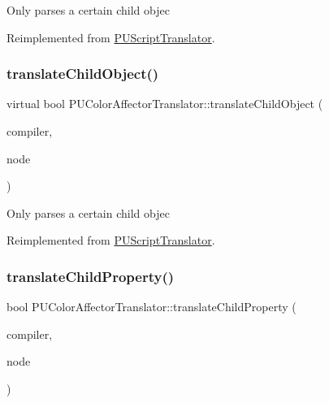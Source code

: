 Only parses a certain child objec 

Reimplemented from \hyperlink{classPUScriptTranslator_ab587d01348ae3e678cb700c719b2b113}{P\+U\+Script\+Translator}.

\mbox{\label{classPUColorAffectorTranslator_a667ea1e6f4626786be341cb0313ed8a2}} 
\subsubsection{\texorpdfstring{translate\+Child\+Object()}{translateChildObject()}\hspace{0.1cm}{\footnotesize\ttfamily [2/2]}}
{\footnotesize\ttfamily virtual bool P\+U\+Color\+Affector\+Translator\+::translate\+Child\+Object (\begin{DoxyParamCaption}\item[{\hyperlink{classPUScriptCompiler}{P\+U\+Script\+Compiler} $\ast$}]{compiler,  }\item[{\hyperlink{classPUAbstractNode}{P\+U\+Abstract\+Node} $\ast$}]{node }\end{DoxyParamCaption})\hspace{0.3cm}{\ttfamily [virtual]}}

Only parses a certain child objec 

Reimplemented from \hyperlink{classPUScriptTranslator_ab587d01348ae3e678cb700c719b2b113}{P\+U\+Script\+Translator}.

\mbox{\label{classPUColorAffectorTranslator_a80eaf9a76c5563fa19d55d1e09a5d1da}} 
\subsubsection{\texorpdfstring{translate\+Child\+Property()}{translateChildProperty()}\hspace{0.1cm}{\footnotesize\ttfamily [1/2]}}
{\footnotesize\ttfamily bool P\+U\+Color\+Affector\+Translator\+::translate\+Child\+Property (\begin{DoxyParamCaption}\item[{\hyperlink{classPUScriptCompiler}{P\+U\+Script\+Compiler} $\ast$}]{compiler,  }\item[{\hyperlink{classPUAbstractNode}{P\+U\+Abstract\+Node} $\ast$}]{node }\end{DoxyParamCaption})\hspace{0.3cm}{\ttfamily [virtual]}}

